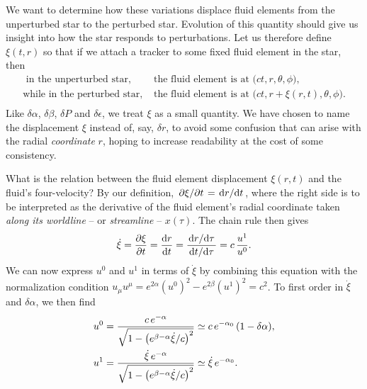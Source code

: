 We want to determine how these variations displace fluid elements from the unperturbed star to the perturbed star.
Evolution of this quantity should give us insight into how the star responds to perturbations.
Let us therefore define $\xi(t, r)$ so that if we attach a tracker to some fixed fluid element in the star, then
\begin{equation}
\begin{split}
	\text{      in the unperturbed star, } & \text{the fluid element is at $\big(ct,r,\theta,\phi\big)$,} \\
	\text{while in the   perturbed star, } & \text{the fluid element is at $\big(ct,r+\xi(r,t),\theta,\phi\big)$.} \\
\end{split}
\end{equation}
Like $\delta \alpha$, $\delta \beta$, $\delta P$ and $\delta \epsilon$, we treat $\xi$ as a small quantity.
We have chosen to name the displacement $\xi$ instead of, say, $\delta r$, to avoid some confusion that can arise with the radial \emph{coordinate} $r$, hoping to increase readability at the cost of some consistency.

What is the relation between the fluid element displacement $\xi(r,t)$ and the fluid's four-velocity?
By our definition, $\pdv{\xi}/{t} = \odv{r}/{t}$, where the right side is to be interpreted as the derivative of the fluid element's radial coordinate taken \emph{along its worldline} -- or \emph{streamline} -- $x(\tau)$.
The chain rule then gives
\begin{equation}
	\dot\xi = \pdv{\xi}{t} = \odv{r}{t} = \frac{\odv{r}/{\tau}}{\odv{t}/{\tau}} = c \, \frac{u^1}{u^0} .
\end{equation}
We can now express $u^0$ and $u^1$ in terms of $\dot\xi$ by combining this equation with the normalization condition $u_\mu u^\mu = e^{2 \alpha} \left( u^0 \right)^2 - e^{2 \beta} \left( u^1 \right)^2 = c^2$.
To first order in $\dot\xi$ and $\delta \alpha$, we then find
\begin{subequations}
\begin{align}
	u^0 &= \frac{c \, e^{-\alpha}}{\sqrt{1 - \left( e^{\beta-\alpha} \dot\xi / c \right)^2 }} \simeq c \, e^{-\alpha_0} \, (1 - \delta \alpha), \label{eq:nstars:velocity_component_t} \\
	u^1 &= \frac{\dot\xi \, e^{-\alpha}}{\sqrt{1 - \left( e^{\beta-\alpha} \dot\xi / c \right)^2 }} \simeq \dot\xi \, e^{-\alpha_0} . \label{eq:nstars:velocity_component_r}
\end{align}%
\label{eq:nstars:velocity_components}%
\end{subequations}%

